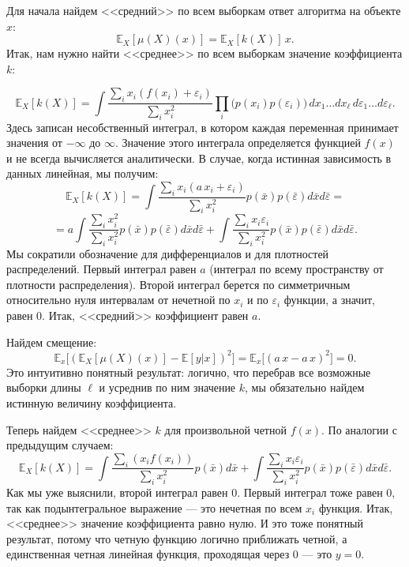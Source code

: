\documentclass[12pt,fleqn]{article}
\begin{document}
    \begin{esSolution}
    	Для начала найдем <<средний>> по всем выборкам ответ алгоритма на объекте $x$:
    	\[
    	\mathbb{E}_{X}[\mu(X)(x)] = \mathbb{E}_{X}[k(X)] \, x.
    	\]
    	Итак, нам нужно найти <<среднее>> по всем выборкам значение коэффициента $k$:
    	
    	\begin{equation}
    	\label{k_eq}
    	\mathbb{E}_{X}[k(X)] = \int \frac{\sum_i x_i (f(x_i)+\varepsilon_i)}{\sum_i x_i^2} \prod_i \bigl( p(x_i) p(\varepsilon_i) \bigr) \, dx_1 \dots dx_\ell \, d\varepsilon_1 \dots d\varepsilon_\ell.
    	\end{equation}
    	Здесь записан несобственный интеграл, в котором каждая переменная принимает значения от $-\infty$ до $\infty$. Значение этого интеграла определяется функцией $f(x)$ и не всегда вычисляется аналитически. В случае, когда истинная зависимость в данных линейная, мы получим:
    	\[
    	\mathbb{E}_{X}[k(X)] =  \int \frac{\sum_i x_i (a\,x_i+\varepsilon_i)}{\sum_i x_i^2}  p(\bar x) p(\bar \varepsilon)  d \bar x d \bar \varepsilon = 
    	\]
    	\[
    	=a \int \frac{\sum_i x_i^2}{\sum_i x_i^2}  p(\bar x)  p(\bar \varepsilon)  d \bar x d \bar \varepsilon +
    	\int \frac{\sum_i x_i \varepsilon_i}{\sum_i x_i^2}  p(\bar x)  p(\bar \varepsilon)  d \bar x d \bar \varepsilon.
    	\] 
    	Мы сократили обозначение для дифференциалов и для плотностей распределений. Первый интеграл равен $a$ (интеграл по всему пространству от плотности распределения). Второй интеграл берется по симметричным относительно нуля интервалам от нечетной по $x_i$ и по $\varepsilon_i$ функции, а значит, равен 0. Итак, <<средний>> коэффициент равен $a$.
    	
    	Найдем смещение:
    	\[
    	\mathbb{E}_{x}\bigl[(\mathbb{E}_{X}[\mu(X)(x)] - \mathbb{E}[y|x] )^2\bigr] = \mathbb{E}_{x}\bigl[(a\,x -  a\, x )^2\bigr] = 0.
    	\]
    	Это интуитивно понятный результат: логично, что перебрав все возможные выборки длины $\ell$ и усреднив по ним значение $k$, мы обязательно найдем истинную величину коэффициента.
    	
    	Теперь найдем <<среднее>> $k$ для произвольной четной  $f(x)$. По аналогии с предыдущим случаем:
    	\[
    	\mathbb{E}_{X}[k(X)] = 
    	\int \frac{\sum_i ( x_i f(x_i)) }{\sum_i x_i^2}  p(\bar x)  d\bar x  +
    	\int \frac{\sum_i x_i \varepsilon_i}{\sum_i x_i^2}  p(\bar x)  p(\bar \varepsilon)  d \bar x d \bar \varepsilon.
    	\]  
    	Как мы уже выяснили, второй интеграл равен 0. Первый интеграл тоже равен 0, так как подынтегральное выражение --- это нечетная по всем $x_i$ функция. Итак, <<среднее>> значение коэффициента равно нулю. И это тоже понятный результат, потому что четную функцию логично приближать четной, а единственная четная линейная функция, проходящая через 0 --- это $y = 0$.
    	

\end{esSolution}
\end{document}
